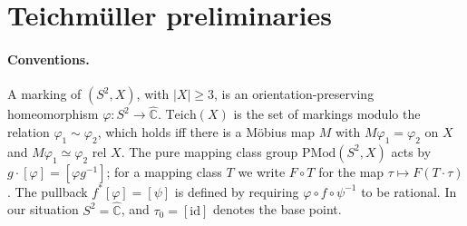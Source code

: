 \documentclass[11pt]{article}
\theoremstyle{definition}
\newcommand{\Teich}{\mathrm{Teich}}
\newcommand{\PMod}{\mathrm{PMod}}
\newcommand{\Ch}{\hat{\mathbb C}}
\begin{document}
\section{Teichm\"uller preliminaries}\label{sec:teich}

\paragraph{Conventions.} A marking of $(S^2,X)$, with $|X|\ge3$, is an orientation-preserving homeomorphism $\varphi\colon S^2\to\Ch$. $\Teich(X)$ is the set of markings modulo the relation $\varphi_1\sim\varphi_2$, which holds iff there is a M\"obius map $M$ with $M\varphi_1=\varphi_2$ on $X$ and $M\varphi_1\simeq\varphi_2$ rel $X$. The pure mapping class group $\PMod(S^2,X)$ acts by $g\cdot[\varphi]=[\varphi g^{-1}]$; for a mapping class $T$ we write $F\circ T$ for the map $\tau\mapsto F(T\cdot\tau)$. The pullback $f^*[\varphi]=[\psi]$ is defined by requiring $\varphi\circ f\circ\psi^{-1}$ to be rational. In our situation $S^2=\Ch$, and $\tau_0=[\mathrm{id}]$ denotes the base point.
\end{document}
